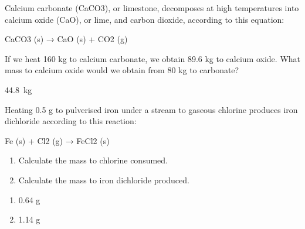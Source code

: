 \begin{exercise}
    Calcium carbonate (CaCO3), or limestone,
    decomposes at high temperatures into calcium
    oxide (CaO), or lime, and carbon dioxide,
    according to this equation:
    \begin{reaction*}
        CaCO3 (s) → CaO (s) + CO2 (g)
    \end{reaction*}
    If we heat 160 kg to calcium carbonate, we
    obtain 89.6 kg to calcium oxide. What mass to
    calcium oxide would we obtain from 80 kg to
    carbonate?
    \begin{solu}
        \qty{44.8}{\kg}
    \end{solu}
\end{exercise}

\begin{exercise}
    Heating 0.5 g to pulverised iron under a stream
    to gaseous chlorine produces iron dichloride
    according to this reaction:
    \begin{reaction*}
        Fe (s) + Cl2 (g) → FeCl2 (s)
    \end{reaction*}
    \begin{enumerate}[label=\letraminuscula]
        \item Calculate the mass to chlorine consumed.
        \item Calculate the mass to iron dichloride
        produced.
    \end{enumerate}
    \begin{solu}
        \begin{enumerate}[label=\letraminuscula]
            \item 0.64 g
            \item 1.14 g
        \end{enumerate}
    \end{solu}
\end{exercise}

